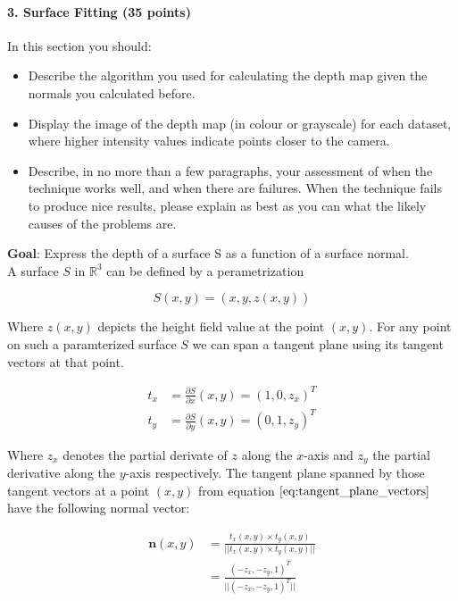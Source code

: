 \documentclass{paper}
\begin{document}
\paragraph{3. Surface Fitting (35 points)}

In this section you should: 

\begin{itemize}
\item Describe the algorithm you used for calculating the depth map given the normals you calculated before.
\item Display the image of the depth map (in colour or grayscale) for each dataset, where higher intensity values indicate points closer to the camera.
\item Describe, in no more than a few paragraphs, your assessment of when the technique works well, and when there are failures. When the technique fails to produce nice results, please explain as best as you can what the likely causes of the problems are.
\end{itemize}


\textbf{Goal}: Express the depth of a surface S as a function of a surface normal. \\
A surface $S$ in $\mathbb{R}^3$ can be defined by a perametrization 

\begin{equation}
    S(x,y) = (x,y,z(x,y))
\end{equation}

Where $z(x,y)$ depicts the height field value at the point $(x,y)$. For any point on such a paramterized surface $S$ we can span a tangent plane using its tangent vectors at that point.

\begin{align}
    t_x &= \frac{\partial S}{\partial x}(x,y) = (1,0,z_x)^T \nonumber \\
    t_y &= \frac{\partial S}{\partial y}(x,y) = (0,1,z_y)^T
\label{eq:tangent_plane_vectors}
\end{align}

Where $z_x$ denotes the partial derivate of $z$ along the $x$-axis and $z_y$ the partial derivative along the $y$-axis respectively. The tangent plane spanned by those tangent vectors at a point $(x,y)$ from equation $\ref{eq:tangent_plane_vectors}$ have the following normal vector:

\begin{align}
    \textbf{n}(x,y) &= \frac{t_x(x,y) \times t_y(x,y)}{|| t_x(x,y) \times t_y(x,y)||}\nonumber \\
     &= \frac{(-z_x, -z_y, 1)^T}{||(-z_x, -z_y, 1)^T||}
\label{eq:tan_plane_normal}
\end{align}
\end{document}
